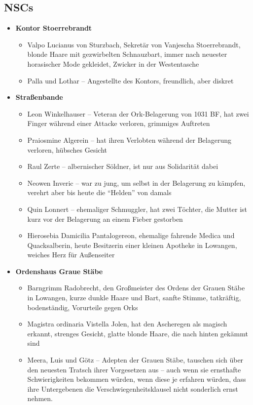 \subsection*{NSCs}
\begin{itemize}
    \item \textbf{Kontor Stoerrebrandt}
        \begin{itemize}
        	\item  Valpo Lucianus von Sturzbach, Sekretär von Vanjescha Stoerrebrandt, blonde Haare mit gezwirbelten Schnauzbart, immer nach neuester horasischer Mode gekleidet, Zwicker in der Westentasche
        \item Palla und Lothar -- Angestellte des Kontors, freundlich, aber diskret
                \end{itemize}
    \item \textbf{Straßenbande}
                \begin{itemize}
        	\item  Leon Winkelhauser -- Veteran der Ork-Belagerung von 1031 BF, hat zwei Finger während einer Attacke verloren, grimmiges Auftreten
        \item Praiosmine Algerein -- hat ihren Verlobten während der Belagerung verloren, hübsches Gesicht
        \item Raul Zerte -- albernischer Söldner, ist nur aus Solidarität dabei
        \item Neowen Inveric -- war zu jung, um selbst in der Belagerung zu kämpfen, verehrt aber bis heute die \enquote{Helden} von damals
    \item Quin Lonnert -- ehemaliger Schmuggler, hat zwei Töchter, die Mutter ist kurz vor der Belagerung an einem Fieber gestorben
    \item Hierosebia Damicilia Pantalogereon, ehemalige fahrende Medica und Quacksalberin, heute Besitzerin einer kleinen Apotheke in Lowangen, weiches Herz für Außenseiter
    \end{itemize}
    \item \textbf{Ordenshaus Graue Stäbe}
                \begin{itemize}
        	\item  Barngrimm Radobrecht, den Großmeister des Ordens der Grauen Stäbe in Lowangen, kurze dunkle Haare und Bart, sanfte Stimme, tatkräftig, bodenständig, Vorurteile gegen Orks
      \item  Magistra ordinaria Vistella Jolen, hat den Ascheregen als magisch erkannt, strenges Gesicht, glatte blonde Haare, die nach hinten gekämmt sind
        \item Meera, Luis und Götz -- Adepten der Grauen Stäbe, tauschen sich über den neuesten Tratsch ihrer Vorgesetzen aus -- auch wenn sie ernsthafte Schwierigkeiten bekommen würden, wenn diese je erfahren würden, dass ihre Untergebenen die Verschwiegenheitsklausel nicht sonderlich ernst nehmen.
        \end{itemize}
        \end{itemize}

